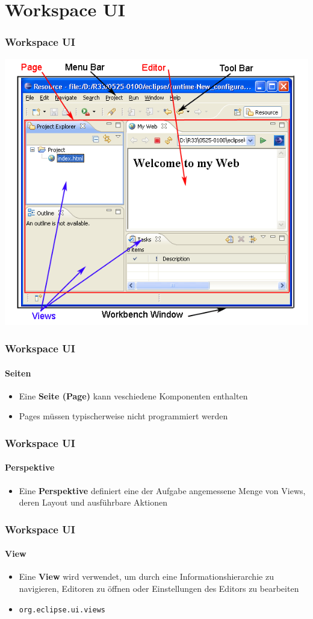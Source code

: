 {\section{Workspace UI}
\begin{frame}
  \frametitle{Workspace UI}
  \includegraphics[scale=0.4]{images/workspace-ui.png}
\end{frame}

\begin{frame}
  \frametitle{Workspace UI}
  \framesubtitle{Seiten}
  \begin{itemize}
    \item Eine \textbf{Seite (Page)} kann veschiedene Komponenten enthalten
    \item Pages müssen typischerweise nicht programmiert werden
  \end{itemize}
\end{frame}

\begin{frame}
  \frametitle{Workspace UI}
  \framesubtitle{Perspektive}
  \begin{itemize}
    \item Eine \textbf{Perspektive} definiert eine der Aufgabe angemessene Menge von Views, deren Layout und ausführbare Aktionen
  \end{itemize}
\end{frame}

\begin{frame}
  \frametitle{Workspace UI}
  \framesubtitle{View}
  \begin{itemize}
    \item Eine \textbf{View} wird verwendet, um durch eine Informationshierarchie zu navigieren, Editoren zu öffnen oder Einstellungen des Editors zu bearbeiten
    \item \texttt{org.eclipse.ui.views}
  \end{itemize}
\end{frame}

}
